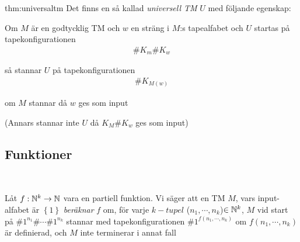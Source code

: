 \begin{theo}[Universell TM]{thm:universaltm}
  Det finns en så kallad \textit{universell TM} $U$ med följande egenskap:
  \par\bigskip
   Om $M$ är en godtycklig TM och $w$ en sträng i $M$:s tapealfabet och $U$ startas på tapekonfigurationen
   \begin{equation*}
     \begin{gathered}
       \#K_m\#K_w
     \end{gathered}
   \end{equation*}\par
   så stannar $U$ på tapekonfigurationen
   \begin{equation*}
     \begin{gathered}
       \#K_{M(w)}
     \end{gathered}
   \end{equation*}\par
   om $M$ stannar då $w$ ges som input
   \par\bigskip
   \noindent (Annars stannar inte $U$ då $K_M\#K_w$ ges som input)
\end{theo}
\par\bigskip
\subsection{Funktioner}\hfill\\\par
\noindent Låt $f:\mathbb{N}^k\to\mathbb{N}$ vara en partiell funktion. Vi säger att en TM $M$, vars input-alfabet är $\left\{1\right\}$ \textit{beräknar} $f$ om, för varje $k-tupel$ ($n_1,\cdots,n_k$)$\in\mathbb{N}^k$, $M$ vid start på $\#1^{n_1}\#\cdots\#1^{n_k}$ stannar med tapekonfigurationen $\#1^{f(n_1,\cdots,n_k)}$ om $f(n_1,\cdots,n_k)$ är definierad, och $M$ inte terminerar i annat fall
\par\bigskip
